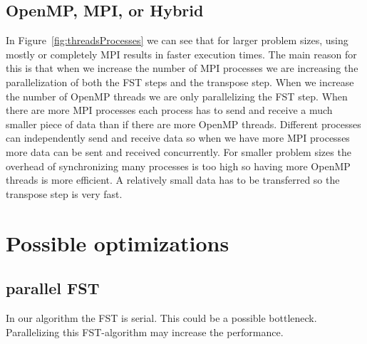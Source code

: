 \documentclass{article}
\begin{document}
\subsection{OpenMP, MPI, or Hybrid}

	In Figure~\ref{fig:threadsProcesses} we can see that for larger problem sizes, using mostly or completely MPI results in faster execution times. The main reason for this is that when we increase the number of MPI processes we are increasing the parallelization of both the FST steps and the transpose step. When we increase the number of OpenMP threads we are only parallelizing the FST step. When there are more MPI processes each process has to send and receive a much smaller piece of data than if there are more OpenMP threads. Different processes can independently send and receive data so when we have more MPI processes more data can be sent and received concurrently. For smaller problem sizes the overhead of synchronizing many processes is too high so having more OpenMP threads is more efficient. A relatively small data has to be transferred so the transpose step is very fast.





\section{Possible optimizations}
\subsection{parallel FST}
In our algorithm the FST is serial. This could be a possible bottleneck. Parallelizing this FST-algorithm may increase the performance.
\end{document}
